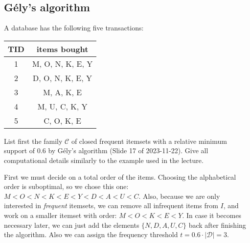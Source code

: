 \documentclass{article}
\begin{document}
  \subsection{Gély's algorithm}
  \begin{centerframebox}
    A database has the following five transactions:

    \begin{center}
      \begin{tabular}{|c|c|}
        \hline
        TID & items bought \\ \hline
        1 & M, O, N, K, E, Y \\ \hline
        2 & D, O, N, K, E, Y \\ \hline
        3 & M, A, K, E \\ \hline
        4 & M, U, C, K, Y \\ \hline
        5 & C, O, K, E \\ \hline
      \end{tabular}
    \end{center}

    List first the family $\mathcal{C}$ of closed frequent itemsets with a relative minimum
    support of $0.6$ by Gély's algorithm (Slide 17 of 2023-11-22). Give all
    computational details similarly to the example used in the lecture.
  \end{centerframebox}
  First we must decide on a total order of the items.
  Choosing the alphabetical order is suboptimal, so we chose this one: $M < O < N < K < E < Y < D < A < U < C$.
  Also, because we are only interested in \textit{frequent} itemsets, we can remove all infrequent items from $I$, and work on a smaller itemset with order: $M < O < K < E < Y$.
  In case it becomes necessary later, we can just add the elements $\{N, D, A, U, C\}$ back after finishing the algorithm.
  Also we can assign the frequency threshold $t = 0.6 \cdot |\mathcal{D}| = 3$.
\end{document}
